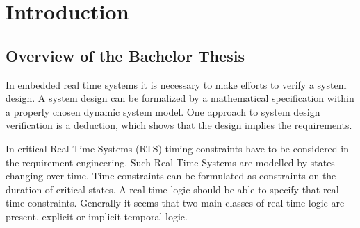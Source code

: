 






\chapter{Introduction}  %
\label{chapter:1}
\ifpdf
    \graphicspath{{Chapter1/Figs/Raster/}{Chapter1/Figs/PDF/}{Chapter1/Figs/}}
\else
    \graphicspath{{Chapter1/Figs/Vector/}{Chapter1/Figs/}}
\fi


\section{Overview of the Bachelor Thesis } %

In embedded real time systems it is necessary to make efforts to verify a system design.
A system design can be formalized by a mathematical specification within a properly chosen dynamic system model.
One approach to system design verification is a deduction, which shows that the design implies the requirements. 

In critical Real Time Systems (RTS) timing constraints have to be considered in the requirement engineering.
Such Real Time Systems are modelled by states changing over time.
Time constraints can be formulated as constraints on the duration of critical states. 
A real time logic should be able to specify that real time constraints. Generally it seems that two main classes
of real time logic are present, explicit or implicit temporal logic.\cite{210306} 

